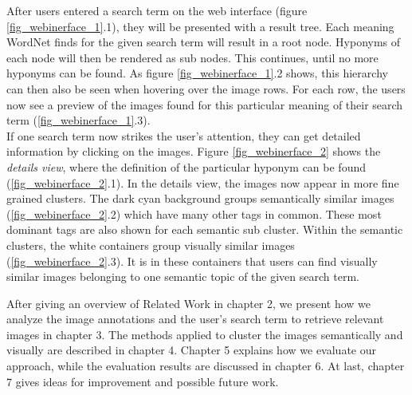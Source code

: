 After users entered a search term on the web interface (figure \ref{fig_webinerface_1}.1), they will be presented with a result tree.
Each meaning WordNet finds for the given search term will result in a root node.
Hyponyms of each node will then be rendered as sub nodes.
This continues, until no more hyponyms can be found.
As figure \ref{fig_webinerface_1}.2 shows, this hierarchy can then also be seen when hovering over the image rows.
For each row, the users now see a preview of the images found for this particular meaning of their search term (\ref{fig_webinerface_1}.3). \\
If one search term now strikes the user's attention, they can get detailed information by clicking on the images.
Figure \ref{fig_webinerface_2} shows the \emph{details view}, where the definition of the particular hyponym can be found (\ref{fig_webinerface_2}.1).
In the details view, the images now appear in more fine grained clusters.
The dark cyan background groups semantically similar images (\ref{fig_webinerface_2}.2) which have many other tags in common. These most dominant tags are also shown for each semantic sub cluster.
Within the semantic clusters, the white containers group visually similar images (\ref{fig_webinerface_2}.3). It is in these containers that users can find visually similar images belonging to one semantic topic of the given search term.

\bigskip

After giving an overview of Related Work in chapter 2, we present how we analyze the image annotations and the user's search term to retrieve relevant images in chapter 3. The methods applied to cluster the images semantically and visually are described in chapter 4. Chapter 5 explains how we evaluate our approach, while the evaluation results are discussed in chapter 6. At last, chapter 7 gives ideas for improvement and possible future work.
